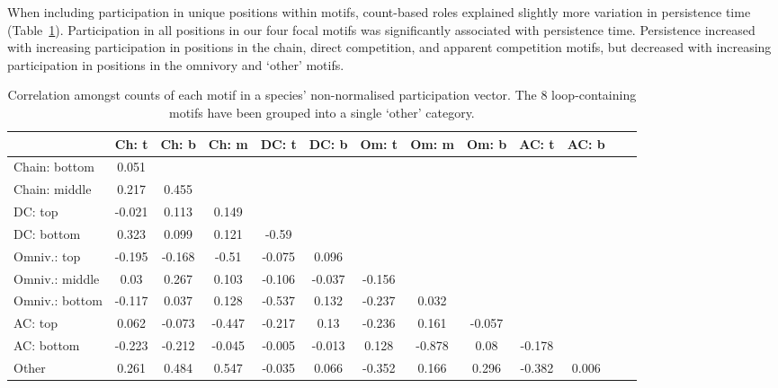 \documentclass[12pt]{article}
\begin{document}
\begin{spacing}{2.0}
        
        When including participation in unique positions within motifs, count-based roles explained slightly more variation in persistence time (Table~\ref{tab:position_count_correlations}).
        Participation in all positions in our four focal motifs was significantly associated with persistence time.
        Persistence increased with increasing participation in positions in the chain, direct competition, and apparent competition motifs, but decreased with increasing participation in positions in the omnivory and `other' motifs.


		\begin{table}[hb!]
    		\caption{Correlation amongst counts of each motif in a species' non-normalised participation vector. The 8 loop-containing motifs have been grouped into a single `other' category.}
    		\label{tab:position_count_correlations}
    		\footnotesize
    		\begin{tabular}{l | c c c c c c c c c c c c}    
        		&	Ch: t	&	Ch: b	&	Ch: m	&	DC: t	&	DC: b	&	Om: t	&	Om: m	&	Om: b	&	AC: t	&	AC: b	\\
                \hline
                Chain: bottom	&	0.051	&		&		&		&		&		&		&		&		&		\\
                Chain: middle	&	0.217	&	0.455	&		&		&		&		&		&		&		&		\\
                DC: top	&	-0.021	&	0.113	&	0.149	&		&		&		&		&		&		&		\\
                DC: bottom	&	0.323	&	0.099	&	0.121	&	-0.59	&		&		&		&		&		&		\\
                Omniv.: top	&	-0.195	&	-0.168	&	-0.51	&	-0.075	&	0.096	&		&		&		&		&		\\
                Omniv.: middle	&	0.03	&	0.267	&	0.103	&	-0.106	&	-0.037	&	-0.156	&		&		&		&		\\
                Omniv.: bottom	&	-0.117	&	0.037	&	0.128	&	-0.537	&	0.132	&	-0.237	&	0.032	&		&		&		\\
                AC: top	&	0.062	&	-0.073	&	-0.447	&	-0.217	&	0.13	&	-0.236	&	0.161	&	-0.057	&		&		\\
                AC: bottom	&	-0.223	&	-0.212	&	-0.045	&	-0.005	&	-0.013	&	0.128	&	-0.878	&	0.08	&	-0.178	&		\\
                Other	&	0.261	&	0.484	&	0.547	&	-0.035	&	0.066	&	-0.352	&	0.166	&	0.296	&	-0.382	&	0.006	\\
                \hline
            \end{tabular}
            \end{table}
            


\end{spacing}
\end{document}
